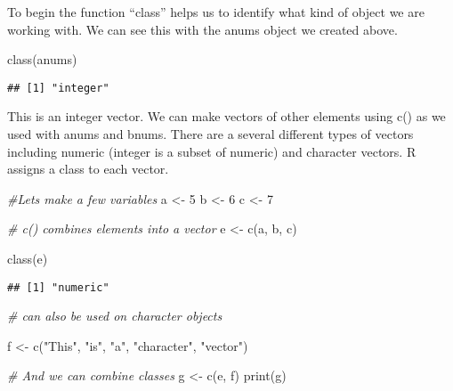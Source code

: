 \documentclass[
]{article}
\newenvironment{Shaded}{\begin{snugshade}}{\end{snugshade}}
\newcommand{\CommentTok}[1]{\textcolor[rgb]{0.56,0.35,0.01}{\textit{#1}}}
\newcommand{\DecValTok}[1]{\textcolor[rgb]{0.00,0.00,0.81}{#1}}
\newcommand{\FunctionTok}[1]{\textcolor[rgb]{0.00,0.00,0.00}{#1}}
\newcommand{\NormalTok}[1]{#1}
\newcommand{\OtherTok}[1]{\textcolor[rgb]{0.56,0.35,0.01}{#1}}
\newcommand{\StringTok}[1]{\textcolor[rgb]{0.31,0.60,0.02}{#1}}
\begin{document}
To begin the function ``class'' helps us to identify what kind of object
we are working with. We can see this with the anums object we created
above.

\begin{Shaded}
\begin{Highlighting}[]
\FunctionTok{class}\NormalTok{(anums)}
\end{Highlighting}
\end{Shaded}

\begin{verbatim}
## [1] "integer"
\end{verbatim}

This is an integer vector. We can make vectors of other elements using
c() as we used with anums and bnums. There are a several different types
of vectors including numeric (integer is a subset of numeric) and
character vectors. R assigns a class to each vector.

\begin{Shaded}
\begin{Highlighting}[]
\CommentTok{\#Let\textquotesingle{}s make a few variables}
\NormalTok{a }\OtherTok{\textless{}{-}} \DecValTok{5}
\NormalTok{b }\OtherTok{\textless{}{-}} \DecValTok{6}
\NormalTok{c }\OtherTok{\textless{}{-}} \DecValTok{7}

\CommentTok{\# c() combines elements into a vector}
\NormalTok{e }\OtherTok{\textless{}{-}} \FunctionTok{c}\NormalTok{(a, b, c)             }

\FunctionTok{class}\NormalTok{(e)}
\end{Highlighting}
\end{Shaded}

\begin{verbatim}
## [1] "numeric"
\end{verbatim}

\begin{Shaded}
\begin{Highlighting}[]
\CommentTok{\# can also be used on character objects}

\NormalTok{f }\OtherTok{\textless{}{-}} \FunctionTok{c}\NormalTok{(}\StringTok{"This"}\NormalTok{, }\StringTok{"is"}\NormalTok{, }\StringTok{"a"}\NormalTok{, }\StringTok{"character"}\NormalTok{, }\StringTok{"vector"}\NormalTok{)    }

\CommentTok{\# And we can combine classes}
\NormalTok{g }\OtherTok{\textless{}{-}} \FunctionTok{c}\NormalTok{(e, f)                }
\FunctionTok{print}\NormalTok{(g)}
\end{Highlighting}
\end{Shaded}
\end{document}
